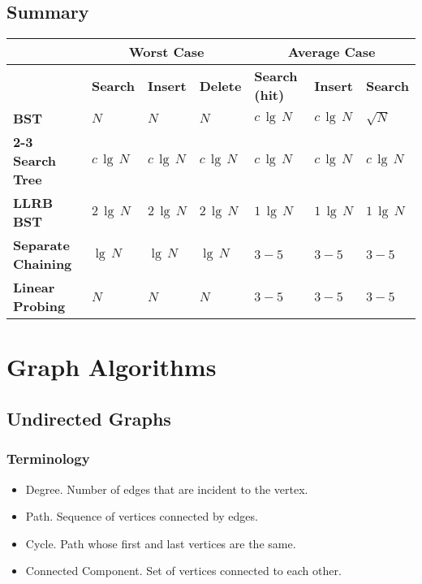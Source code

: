 \documentclass[a4paper]{article}
\begin{document}
\subsection{Summary}
\begin{spacing}{1.5}
\begin{tabularx}{1\textwidth}{|X|X|X|X|X|X|X|}
    \hline
    & \multicolumn{3}{c|}{\textbf{Worst Case}} &\multicolumn{3}{c|}{\textbf{Average Case}}\\
    \hline
    & \textbf{Search} & \textbf{Insert} & \textbf{Delete} & \textbf{Search (hit)} & \textbf{Insert} & \textbf{Search}\\
    \hline
    \textbf{BST}&$N$&$N$&$N$&$c\,\lg\,N$&$c\,\lg\,N$&$\sqrt{N}$\\
    \hline
    \textbf{2-3 Search Tree}&$c\,\lg\,N$&$c\,\lg\,N$&$c\,\lg\,N$&$c\,\lg\,N$&$c\,\lg\,N$&$c\,\lg\,N$\\
    \hline
    \textbf{LLRB BST}&$2\,\lg\,N$&$2\,\lg\,N$&$2\,\lg\,N$&$1\,\lg\,N$&$1\,\lg\,N$&$1\,\lg\,N$\\
    \hline
    \textbf{Separate Chaining}&$\lg\,N$&$\lg\,N$&$\lg\,N$&$3-5$&$3-5$&$3-5$\\
    \hline
    \textbf{Linear Probing}&$N$&$N$&$N$&$3-5$&$3-5$&$3-5$\\
    \hline
\end{tabularx}
\end{spacing}

\section{Graph Algorithms}
\subsection{Undirected Graphs}
\subsubsection*{Terminology}
\begin{itemize}
    \item Degree. Number of edges that are incident to the vertex.
    \item Path. Sequence of vertices connected by edges.
    \item Cycle. Path whose first and last vertices are the same.
    \item Connected Component. Set of vertices connected to each other.
\end{itemize}
\end{document}
